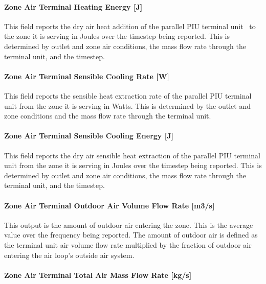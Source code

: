 \paragraph{Zone Air Terminal Heating Energy {[}J{]}}\label{zone-air-terminal-heating-energy-j-1}

This field reports the dry air heat addition of the parallel PIU terminal unit~ to the zone it is serving in Joules over the timestep being reported. This is determined by outlet and zone air conditions, the mass flow rate through the terminal unit, and the timestep.

\paragraph{Zone Air Terminal Sensible Cooling Rate {[}W{]}}\label{zone-air-terminal-sensible-cooling-rate-w-2}

This field reports the sensible heat extraction rate of the parallel PIU terminal unit from the zone it is serving in Watts. This is determined by the outlet and zone conditions and the mass flow rate through the terminal unit.

\paragraph{Zone Air Terminal Sensible Cooling Energy {[}J{]}}\label{zone-air-terminal-sensible-cooling-energy-j-2}

This field reports the dry air sensible heat extraction of the parallel PIU terminal unit from the zone it is serving in Joules over the timestep being reported. This is determined by outlet and zone air conditions, the mass flow rate through the terminal unit, and the timestep.

\paragraph{Zone Air Terminal Outdoor Air Volume Flow Rate {[}m3/s{]}}

This output is the amount of outdoor air entering the zone. This is the average value over the frequency being reported. The amount of outdoor air is defined as the terminal unit air volume flow rate multiplied by the fraction of outdoor air entering the air loop's outside air system.

\paragraph{Zone Air Terminal Total Air Mass Flow Rate {[}kg/s{]}}

